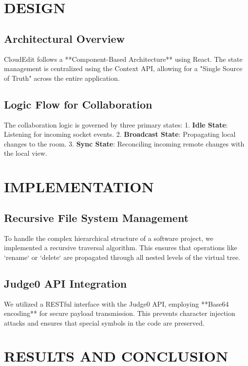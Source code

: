 \documentclass[12pt,a4paper]{report}
\begin{document}
\newpage

\chapter{DESIGN}
\section{Architectural Overview}
CloudEdit follows a **Component-Based Architecture** using React. The state management is centralized using the Context API, allowing for a "Single Source of Truth" across the entire application.

\section{Logic Flow for Collaboration}
The collaboration logic is governed by three primary states:
1. \textbf{Idle State}: Listening for incoming socket events.
2. \textbf{Broadcast State}: Propagating local changes to the room.
3. \textbf{Sync State}: Reconciling incoming remote changes with the local view.

\chapter{IMPLEMENTATION}
\section{Recursive File System Management}
To handle the complex hierarchical structure of a software project, we implemented a recursive traversal algorithm. This ensures that operations like `rename` or `delete` are propagated through all nested levels of the virtual tree.

\section{Judge0 API Integration}
We utilized a RESTful interface with the Judge0 API, employing **Base64 encoding** for secure payload transmission. This prevents character injection attacks and ensures that special symbols in the code are preserved.

\newpage

\chapter{RESULTS AND CONCLUSION}
\end{document}
